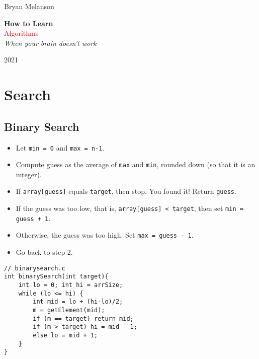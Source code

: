 \documentclass[11pt]{article}
\newcommand*{\plogo}{\fbox{$\mathcal{BM}$}}
\begin{document}
 

\begin{titlepage}

\raggedleft

\vspace*{\baselineskip}

{\Large Bryan Melanson}

\vspace*{0.167\textheight}

\textbf{\LARGE How to Learn}\\[\baselineskip]

{\textcolor{Red}{\Huge Algorithms}}\\[\baselineskip]

{\Large \textit{When your brain doesn't work}}

\vfill

{\large 2021 ~~\plogo}

\vspace*{3\baselineskip}

\end{titlepage}

\pagebreak
\tableofcontents
\pagebreak
\section{Search}



\subsection{Binary Search}

\begin{itemize}
\item Let \texttt{min = 0} and \texttt{max = n-1}.
\item Compute guess as the average of \texttt{max} and \texttt{min}, rounded down (so that it is an integer).
\item If \texttt{array[guess]} equals \texttt{target}, then stop. You found it! Return \texttt{guess}.
\item If the guess was too low, that is, \texttt{array[guess] < target}, then set \texttt{min = guess + 1}.
\item Otherwise, the guess was too high. Set \texttt{max = guess - 1}.
\item Go back to step 2.
\end{itemize}

\begin{lstlisting}
// binarysearch.c
int binarySearch(int target){
    int lo = 0; int hi = arrSize;
    while (lo <= hi) {
        int mid = lo + (hi-lo)/2;
        m = getElement(mid);
        if (m == target) return mid;
        if (m > target) hi = mid - 1;
        else lo = mid + 1;
    }
}
    \end{lstlisting}
\end{document}
